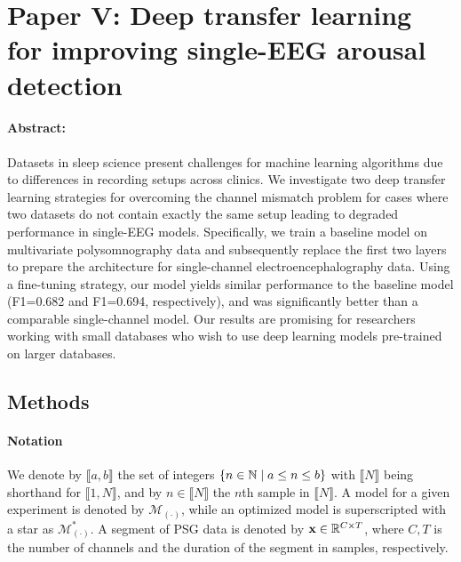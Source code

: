 \section[Paper V: Deep transfer learning for improving single-EEG arousal detection]{Paper V: Deep transfer learning for improving single-EEG arousal detection%
    }\label{sec:paperv}

\begin{tcolorbox}[colframe=white]
\paragraph{Abstract: }
Datasets in sleep science present challenges for machine learning algorithms due to differences in recording setups across clinics. 
We investigate two deep transfer learning strategies for overcoming the channel mismatch problem for cases where two datasets do not contain exactly the same setup leading to degraded performance in single-EEG models. 
Specifically, we train a baseline model on multivariate polysomnography data and subsequently replace the first two layers to prepare the architecture for single-channel electroencephalography data. 
Using a fine-tuning strategy, our model yields similar performance to the baseline model (F1=0.682 and F1=0.694, respectively), and was significantly better than a comparable single-channel model. 
Our results are promising for researchers working with small databases who wish to use deep learning models pre-trained on larger databases.
\end{tcolorbox}


\subsection{Methods}

\paragraph*{Notation} We denote by \(\llbracket a, b \rrbracket\) the set of integers \(\lbrace n \in \mathbb{N} \mid a \leq n \leq b\rbrace\) with \(\llbracket N \rrbracket\) being shorthand for \(\llbracket 1, N \rrbracket\), and by \(n \in \llbracket N \rrbracket \) the \(n\)th sample in \(\llbracket N \rrbracket\).
A model for a given experiment is denoted by $\mathcal{M}_{(\cdot)}$, while an optimized model is superscripted with a star as $\mathcal{M}_{(\cdot)}^{*}$.
A segment of \ac{PSG} data is denoted by $\mathbf{x} \in \mathbb{R}^{C \times T}$, where $C, T$ is the number of channels and the duration of the segment in samples, respectively.

